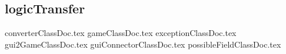 \subsection{logicTransfer}
\label{ss:logicTransfer}
{converterClassDoc.tex}
{gameClassDoc.tex}
\clearpage
{exceptionClassDoc.tex}
{gui2GameClassDoc.tex}
{guiConnectorClassDoc.tex}
{possibleFieldClassDoc.tex}


